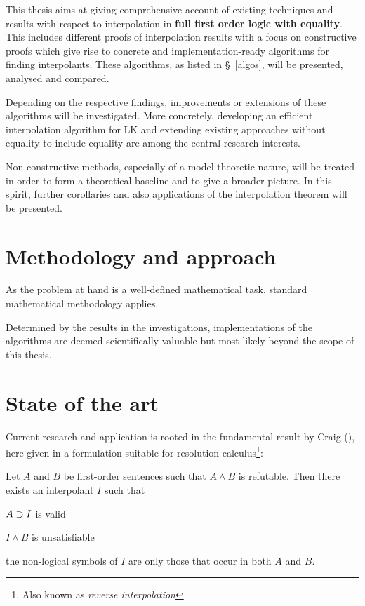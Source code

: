 \documentclass[,%
			paper=a4,%
			DIV11,
			liststotoc,
			bibtotoc,
			draft=false,%
			numbers=noendperiod
			]{scrartcl}
\theoremstyle{definition}
\begin{document}
This thesis aims at giving comprehensive account of existing techniques and results with respect to interpolation in \textbf{full first order logic with equality}.
This includes different proofs of interpolation results with a focus on constructive proofs which give rise to concrete and implementation-ready algorithms for finding interpolants.
These algorithms, as listed in \S~\ref{algos}, will be presented, analysed and compared. 

Depending on the respective findings, improvements or extensions of these algorithms will be investigated.
More concretely, developing an efficient interpolation algorithm for LK and extending existing approaches without equality to include equality are among the central research interests.

Non-constructive methods, especially of a model theoretic nature, will be treated in order to form a theoretical baseline and to give a broader picture.
In this spirit, further corollaries and also applications of the interpolation theorem will be presented.



\section{Methodology and approach}

As the problem at hand is a well-defined mathematical task, standard mathematical methodology applies.

Determined by the results in the investigations, implementations of the algorithms are deemed scientifically valuable but most likely beyond the scope of this thesis.


\section{State of the art}

Current research and application is rooted in the fundamental result by Craig (\cite{craig57linear}), here given in a formulation suitable for resolution calculus\footnote{Also known as \emph{reverse interpolation}}:

\begin{samepage}
\begin{thm}[Interpolation]
	Let $A$ and $B$ be first-order sentences such that $A \land B$ is refutable. 
	Then there exists an interpolant $I$ such that \nopagebreak[4]
	\begin{compactenum}
		\item $ A \supset I$ is valid 
		\item $I \land B$ is unsatisfiable
		\item the non-logical symbols of $I$ are only those that occur in both $A$ and $B$. \qedhere
	\end{compactenum}
\end{thm}
\end{samepage}
\end{document}
